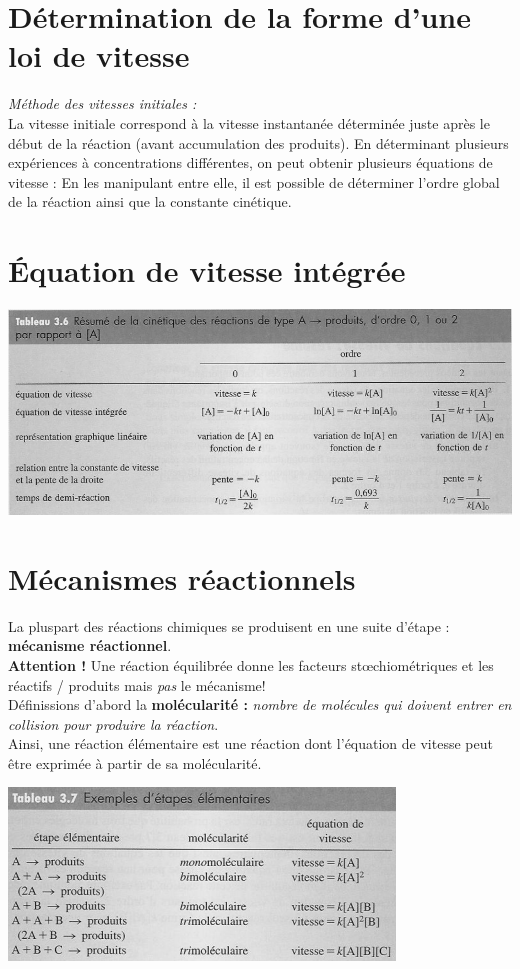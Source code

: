 \documentclass	[11pt, a4paper, openany]{book}
\begin{document}
\section{Détermination de la forme d'une loi de vitesse}
\textit{Méthode des vitesses initiales :}\\
La vitesse initiale correspond à la vitesse instantanée déterminée juste après le début de la réaction (avant accumulation des produits). En déterminant plusieurs expériences à concentrations différentes, on peut obtenir plusieurs équations de vitesse :  En les manipulant entre elle, il est possible de déterminer l'ordre global de la réaction ainsi que la constante cinétique.
\section{Équation de vitesse intégrée}
\begin{center}
	\includegraphics[scale=0.70]{image1.png}\\
\end{center}
\section{Mécanismes réactionnels}
La pluspart des réactions chimiques se produisent en une suite d'étape : \textbf{mécanisme réactionnel}.\\

\textbf{Attention !} Une réaction équilibrée donne les facteurs stœchiométriques et les réactifs / produits mais \textit{pas} le mécanisme!
\\
Définissions d'abord la \textbf{molécularité :} \textit{nombre de molécules qui doivent entrer en collision pour produire la réaction}.\\
Ainsi, une réaction élémentaire est une réaction dont l'équation de vitesse peut être exprimée à partir de sa molécularité.
\begin{center}
	\includegraphics[scale=0.70]{image2.png}\\
\end{center}
\end{document}
